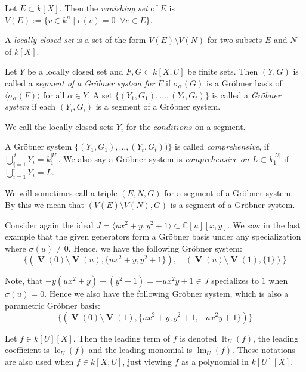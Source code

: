 \documentclass[a4paper, 12pt]{article}
\newcommand{\C}{\mathbb{C}}
\DeclareMathOperator{\LT}{lt}
\DeclareMathOperator{\LM}{lm}
\DeclareMathOperator{\LC}{lc}
\DeclareMathOperator{\V}{\mathbf V}
\theoremstyle{changedot}
\theoremstyle{changedotbreak}
\theoremstyle{nonumberplain}
\begin{document}
\begin{definition}
  Let $E \subset k[X]$. Then the \textit{vanishing set} of $E$ is $V(E) := \{v \in k^{n} \mid e(v) = 0 \;\; \forall e \in E\}$.

  A \textit{locally closed set} is a set of the form $V(E) \setminus V(N)$ for two subsets $E$ and $N$ of $k[X]$.
\end{definition}

\begin{definition}
  Let $Y$ be a locally closed set and $F, G \subset k[X, U]$ be finite sets. Then $(Y, G)$ is called a \textit{segment of a Gröbner system for $F$} if $\sigma_{\alpha}(G)$ is a Gröbner basis of $\langle \sigma_{\alpha}(F) \rangle$ for all $\alpha \in Y$. A set $\{(Y_{1}, G_{1}), \dots, (Y_{t}, G_{t})\}$ is called a \textit{Gröbner system} if each $(Y_{i}, G_{i})$ is a segment of a Gröbner system.

  We call the locally closed sets $Y_{i}$ for the $\textit{conditions}$ on a segment.

  A Gröbner system $\{(Y_{1}, G_{1}), \dots, (Y_{t}, G_{t}))\}$ is called \textit{comprehensive}, if $\bigcup_{i=1}^{\,t}Y_{i} = k_{1}^{|U|}$. We also say a Gröbner system is \textit{comprehensive on $L \subset k_{1}^{|U|}$} if $\bigcup_{i=1}^{t}Y_{i} = L$.
\end{definition}

We will sometimes call a triple $(E, N, G)$ for a segment of a Gröbner system. By this we mean that $(V(E) \setminus V(N), G)$ is a segment of a Gröbner system.

\begin{example}\upshape
  Consider again the ideal $J = \langle ux^{2} + y, y^{2} + 1 \rangle \subset \C[u][x, y]$. We saw in the last example that the given generators form a Gröbner basis under any specialization where $\sigma(u) \neq 0$. Hence, we have the following Gröbner system:
  \[\{(\V(0) \setminus \V(u), \{ux^{2} + y, y^{2} + 1\}), \quad (\V(u) \setminus \V(1), \{1\})\}\]

  Note, that $-y(ux^{2} + y) + (y^{2} + 1) = -ux^{2}y + 1 \in J$ specializes to $1$ when $\sigma(u) = 0$. Hence we also have the following Gröbner system, which is also a parametric Gröbner basis:
  \[\{(\V(0) \setminus \V(1), \{ux^{2} + y, y^{2} + 1, -ux^{2}y + 1\})\}\]
\end{example}

\begin{definition}
  Let $f \in k[U][X]$. Then the leading term of $f$ is denoted $\LT_{U}(f)$, the leading coefficient is $\LC_{U}(f)$ and the leading monomial is $\LM_{U}(f)$. These notations are also used when $f \in k[X, U]$, just viewing $f$ as a polynomial in $k[U][X]$.
\end{definition}
\end{document}
